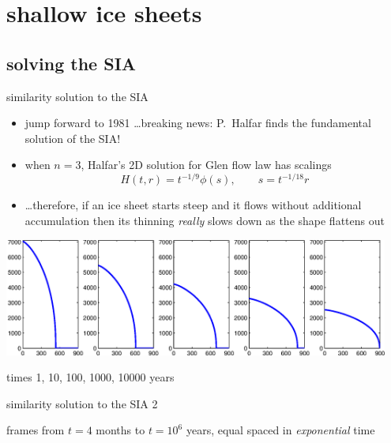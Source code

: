 
\section{shallow ice sheets}

\subsection{solving the SIA}

\begin{frame}{similarity solution to the SIA}

\begin{itemize}
\item jump forward to 1981 \dots breaking news: \quad P.~Halfar finds the fundamental solution of the SIA! \quad [Halfar, 1981; 1983]\nocite{Halfar81,Halfar83}
\item when $n=3$, Halfar's 2D solution for Glen flow law has scalings
   $$H(t,r)=t^{-1/9} \phi(s), \qquad s = t^{-1/18} r$$
\item \dots therefore, if an ice sheet starts steep and it flows without additional accumulation then its thinning \emph{really} slows down as the shape flattens out
\end{itemize}

\medskip
\begin{center}
\includegraphics[width=0.95\textwidth]{pdffigs/siascaling}

\medskip
\scriptsize times 1, 10, 100, 1000, 10000 years
\end{center}
\end{frame}


\begin{frame}{similarity solution to the SIA 2}
\label{slide:plothalfar}


\par
\scriptsize 
frames from $t=4$ months to $t = 10^6$ years, equal spaced in \emph{exponential} time
\end{frame}


